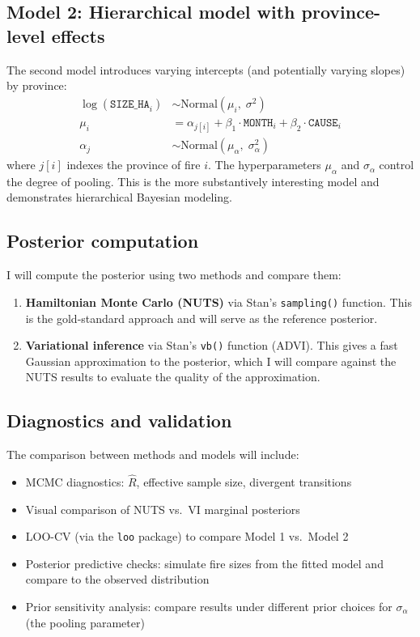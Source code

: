 \documentclass[11pt]{article}
\begin{document}
\subsection{Model 2: Hierarchical model with province-level effects}

The second model introduces varying intercepts (and potentially varying slopes) by province:
%
\begin{align*}
\log(\texttt{SIZE\_HA}_i) &\sim \text{Normal}(\mu_i,\; \sigma^2) \\
\mu_i &= \alpha_{j[i]} + \beta_1 \cdot \texttt{MONTH}_i + \beta_2 \cdot \texttt{CAUSE}_i \\
\alpha_j &\sim \text{Normal}(\mu_\alpha,\; \sigma_\alpha^2)
\end{align*}
%
where $j[i]$ indexes the province of fire $i$. The hyperparameters $\mu_\alpha$ and $\sigma_\alpha$ control the degree of pooling. This is the more substantively interesting model and demonstrates hierarchical Bayesian modeling.

\subsection{Posterior computation}

I will compute the posterior using two methods and compare them:

\begin{enumerate}
    \item \textbf{Hamiltonian Monte Carlo (NUTS)} via Stan's \texttt{sampling()} function. This is the gold-standard approach and will serve as the reference posterior.
    \item \textbf{Variational inference} via Stan's \texttt{vb()} function (ADVI). This gives a fast Gaussian approximation to the posterior, which I will compare against the NUTS results to evaluate the quality of the approximation.
\end{enumerate}

\subsection{Diagnostics and validation}

The comparison between methods and models will include:

\begin{itemize}
    \item MCMC diagnostics: $\hat{R}$, effective sample size, divergent transitions
    \item Visual comparison of NUTS vs.\ VI marginal posteriors
    \item LOO-CV (via the \texttt{loo} package) to compare Model 1 vs.\ Model 2
    \item Posterior predictive checks: simulate fire sizes from the fitted model and compare to the observed distribution
    \item Prior sensitivity analysis: compare results under different prior choices for $\sigma_\alpha$ (the pooling parameter)
\end{itemize}
\end{document}
